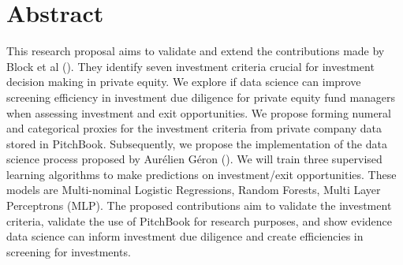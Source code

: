 \documentclass[12pt]{article}
\begin{document}
\section{Abstract}
This research proposal aims to validate and extend the contributions made by Block et al (\citeyear{BLOCK2019329}). 
They identify seven investment criteria crucial for investment decision making in private equity. 
We explore if data science can improve screening efficiency in investment due diligence for private equity fund managers when assessing investment and exit opportunities. 
We propose forming numeral and categorical proxies for the investment criteria from private company data stored in PitchBook. 
Subsequently, we propose the implementation of the data science process proposed by Aur{\'e}lien G{\'e}ron (\citeyear{aurelien2017hands}).
We will train three supervised learning algorithms to make predictions on investment/exit opportunities. 
These models are Multi-nominal Logistic Regressions, Random Forests, Multi Layer Perceptrons (MLP).
The proposed contributions aim to validate the investment criteria, validate the use of PitchBook for research purposes, and show evidence data science can inform investment due diligence and create efficiencies in screening for investments.
\newpage
\tableofcontents
\listoffigures
\listoftables
\newpage
{}
\end{document}
